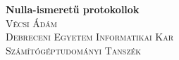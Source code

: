 %
%
%

\begin{titlepage}

\center

{\huge \bfseries {{Nulla-ismeretű protokollok}}}\\[1.5cm]

\textsc{\Large {{Vécsi Ádám}}}\\
\textsc{\large {{Debreceni Egyetem Informatikai Kar}}}\\
\textsc{\large {{Számítógéptudományi Tanszék}}}

\vfill

\end{titlepage}
